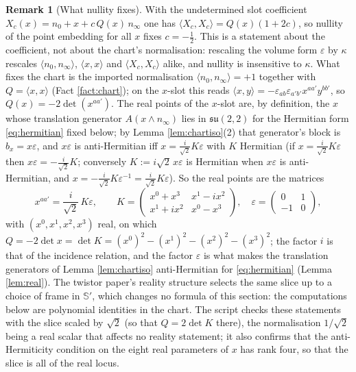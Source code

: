 \documentclass[11pt]{article}
\theoremstyle{definition}
\newtheorem{remark}[theorem]{Remark}
\newcommand{\ip}[2]{\langle #1, #2\rangle}
\newcommand{\Sc}{\mathbb{S}}
\begin{document}
\begin{remark}[What nullity fixes]\label{rem:nullity}
With the undetermined slot coefficient $X_{c}(x) = n_{0} + x + c\,Q(x)\,n_{\infty}$ one has $\ip{X_{c}}{X_{c}} = Q(x)(1 + 2c)$, so nullity of the point embedding for all $x$ fixes $c = -\tfrac12$. This is a statement about the coefficient, not about the chart's normalisation: rescaling the volume form $\varepsilon$ by $\kappa$ rescales $\ip{n_{0}}{n_{\infty}}$, $\ip{x}{x}$ and $\ip{X_{c}}{X_{c}}$ alike, and nullity is insensitive to $\kappa$. What fixes the chart is the imported normalisation $\ip{n_{0}}{n_{\infty}} = +1$ together with $Q = \ip{x}{x}$ (Fact \ref{fact:chart}); on the $x$-slot this reads $\ip{x}{y} = -\varepsilon_{ab}\varepsilon_{a'b'}x^{aa'}y^{bb'}$, so $Q(x) = -2\det(x^{aa'})$. The real points of the $x$-slot are, by definition, the $x$ whose translation generator $A(x\wedge n_{\infty})$ lies in $\mathfrak{su}(2,2)$ for the Hermitian form \eqref{eq:hermitian} fixed below; by Lemma \ref{lem:chartiso}(2) that generator's block is $b_{x} = x\varepsilon$, and $x\varepsilon$ is anti-Hermitian iff $x = \tfrac{i}{\sqrt2}K\varepsilon$ with $K$ Hermitian (if $x = \tfrac{i}{\sqrt2}K\varepsilon$ then $x\varepsilon = -\tfrac{i}{\sqrt2}K$; conversely $K := i\sqrt2\,x\varepsilon$ is Hermitian when $x\varepsilon$ is anti-Hermitian, and $x = -\tfrac{i}{\sqrt2}K\varepsilon^{-1} = \tfrac{i}{\sqrt2}K\varepsilon$). So the real points are the matrices
\begin{equation}\label{eq:realslice}
x^{aa'} = \frac{i}{\sqrt2}\,K\varepsilon, \qquad K = \begin{pmatrix} x^{0}+x^{3} & x^{1}-ix^{2} \\ x^{1}+ix^{2} & x^{0}-x^{3}\end{pmatrix},\quad \varepsilon = \begin{pmatrix} 0 & 1 \\ -1 & 0\end{pmatrix},
\end{equation}
with $(x^{0}, x^{1}, x^{2}, x^{3})$ real, on which $Q = -2\det x = \det K = (x^{0})^{2} - (x^{1})^{2} - (x^{2})^{2} - (x^{3})^{2}$; the factor $i$ is that of the incidence relation, and the factor $\varepsilon$ is what makes the translation generators of Lemma \ref{lem:chartiso} anti-Hermitian for \eqref{eq:hermitian} (Lemma \ref{lem:real}). The twistor paper's reality structure \cite[Prop.~4.5]{ButlerT9} selects the same slice up to a choice of frame in $\Sc'$, which changes no formula of this section: the computations below are polynomial identities in the chart. The script checks these statements with the slice scaled by $\sqrt2$ (so that $Q = 2\det K$ there), the normalisation $1/\sqrt2$ being a real scalar that affects no reality statement; it also confirms that the anti-Hermiticity condition on the eight real parameters of $x$ has rank four, so that the slice is all of the real locus.
\end{remark}
\end{document}
